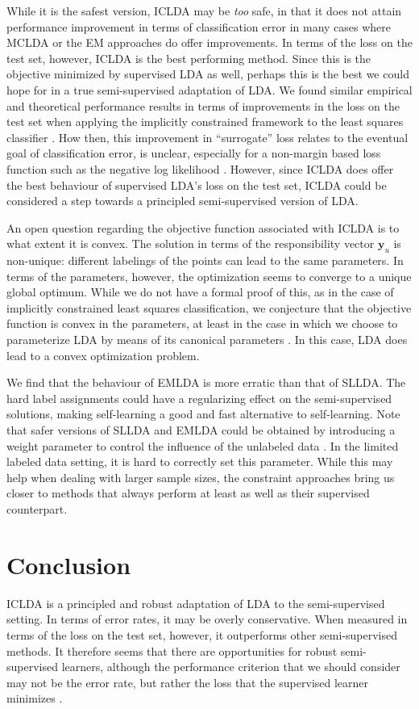 \documentclass[10pt, a4paper, conference]{IEEEtran}
\begin{document}
While it is the safest version, ICLDA may be \emph{too} safe, in that it does not attain performance improvement in terms of classification error in many cases where MCLDA or the EM approaches do offer improvements. In terms of the loss on the test set, however, ICLDA is the best performing method. Since this is the objective minimized by supervised LDA as well, perhaps this is the best we could hope for in a true semi-supervised adaptation of LDA. We found similar empirical and theoretical performance results in terms of improvements in the loss on the test set when applying the implicitly constrained framework to the least squares classifier \cite{Krijthe2013}. How then, this improvement in ``surrogate'' loss relates to the eventual goal of classification error, is unclear, especially for a non-margin based loss function such as the negative log likelihood \cite{Bartlett2006}. However, since ICLDA does offer the best behaviour of supervised LDA's loss on the test set, ICLDA could be considered a step towards a principled semi-supervised version of LDA.

An open question regarding the objective function associated with ICLDA is to what extent it is convex. The solution in terms of the responsibility vector $\mathbf{y}_u$ is non-unique: different labelings of the points can lead to the same parameters. In terms of the parameters, however, the optimization seems to converge to a unique global optimum. While we do not have a formal proof of this, as in the case of implicitly constrained least squares classification, we conjecture that the objective function is convex in the parameters, at least in the case in which we choose to parameterize LDA by means of its canonical parameters \cite{Lehmann1998}.  In this case, LDA does lead to a convex optimization problem.

We find that the behaviour of EMLDA is more erratic than that of SLLDA. The hard label assignments could have a regularizing effect on the semi-supervised solutions, making self-learning a good and fast alternative to self-learning. Note that safer versions of SLLDA and EMLDA could be obtained by introducing a weight parameter to control the influence of the unlabeled data \cite{McLachlan1975}. In the limited labeled data setting, it is hard to correctly set this parameter. While this may help when dealing with larger sample sizes, the constraint approaches bring us closer to methods that always perform at least as well as their supervised counterpart. 

\section{Conclusion}
ICLDA is a principled and robust adaptation of LDA to the semi-supervised setting. In terms of error rates, it may be overly conservative. When measured in terms of the loss on the test set, however, it outperforms other semi-supervised methods. It therefore seems that there are opportunities for robust semi-supervised learners, although the performance criterion that we should consider may not be the error rate, but rather the loss that the supervised learner minimizes \cite{Loog2014b}.
\end{document}
